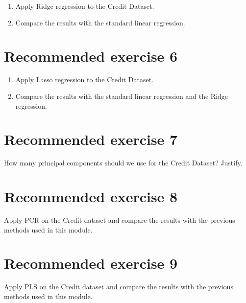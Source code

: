 \documentclass[
]{article}
\providecommand{\tightlist}{%
  \setlength{\itemsep}{0pt}\setlength{\parskip}{0pt}}
\begin{document}
\begin{enumerate}
\def\labelenumi{\arabic{enumi}.}
\tightlist
\item
  Apply Ridge regression to the Credit Dataset.
\item
  Compare the results with the standard linear regression.
\end{enumerate}

\hypertarget{recommended-exercise-6}{%
\section{Recommended exercise 6}\label{recommended-exercise-6}}

\begin{enumerate}
\def\labelenumi{\arabic{enumi}.}
\tightlist
\item
  Apply Lasso regression to the Credit Dataset.
\item
  Compare the results with the standard linear regression and the Ridge
  regression.
\end{enumerate}

\hypertarget{recommended-exercise-7}{%
\section{Recommended exercise 7}\label{recommended-exercise-7}}

How many principal components should we use for the Credit Dataset?
Justify.

\hypertarget{recommended-exercise-8}{%
\section{Recommended exercise 8}\label{recommended-exercise-8}}

Apply PCR on the Credit dataset and compare the results with the
previous methods used in this module.

\hypertarget{recommended-exercise-9}{%
\section{Recommended exercise 9}\label{recommended-exercise-9}}

Apply PLS on the Credit dataset and compare the results with the
previous methods used in this module.
\end{document}
